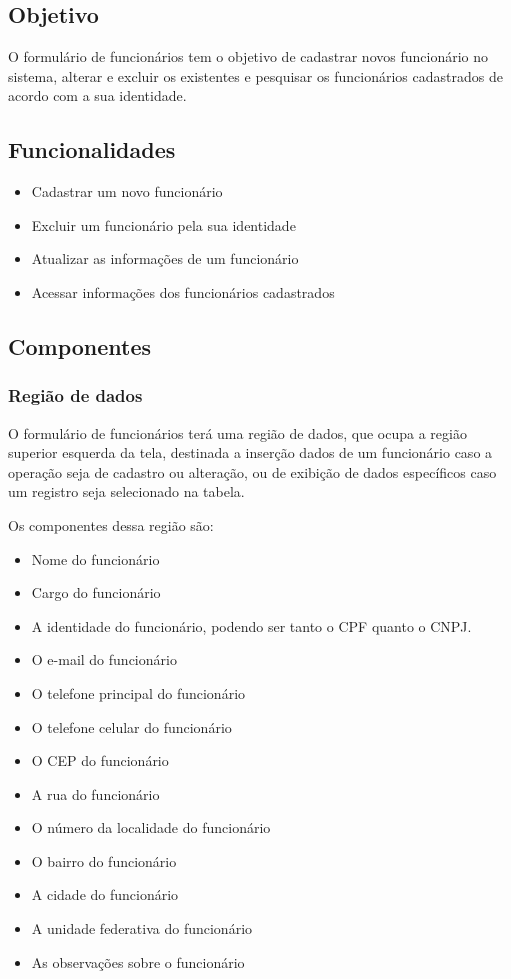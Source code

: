 \documentclass[
	article,			%
	12pt,				%
	oneside,			%
	a4paper,			%
	english,			%
	brazil,				%
	sumario=tradicional
	]{abntex2}
\begin{document}
		\subsection{Objetivo}
		O formulário de funcionários tem o objetivo de cadastrar novos funcionário no sistema, alterar e excluir os existentes e pesquisar os funcionários cadastrados de acordo com a sua identidade.
		\subsection{Funcionalidades}
			\begin{itemize}
				\item Cadastrar um novo funcionário
				\item Excluir um funcionário pela sua identidade
				\item Atualizar as informações de um funcionário
				\item Acessar informações dos funcionários cadastrados
			\end{itemize}
		\subsection{Componentes}
			\subsubsection{Região de dados}
			O formulário de funcionários terá uma região de dados, que ocupa a região superior esquerda da tela, destinada a inserção dados de um funcionário caso a operação seja de cadastro ou alteração, ou de exibição de dados específicos caso um registro seja selecionado na tabela.
			
			Os componentes dessa região são:
			\begin{itemize}\itemsep1.5pt
				\item Nome do funcionário
				\item Cargo do funcionário
				\item A identidade do funcionário, podendo ser tanto o CPF quanto o CNPJ.
				\item O e-mail do funcionário
				\item O telefone principal do funcionário
				\item O telefone celular do funcionário
				\item O CEP do funcionário
				\item A rua do funcionário
				\item O número da localidade do funcionário
				\item O bairro do funcionário
				\item A cidade do funcionário
				\item A unidade federativa do funcionário
				\item As observações sobre o funcionário
			\end{itemize}	
\end{document}
